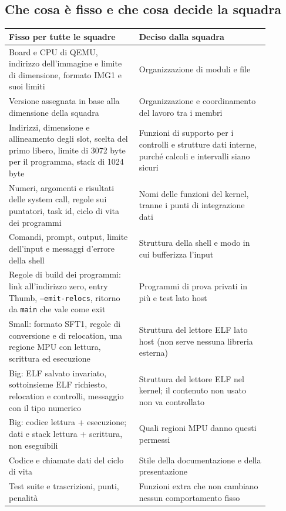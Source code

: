 \subsection{Che cosa è fisso e che cosa decide la squadra}

\begin{center}
\small
\begin{tabular}{|p{0.44\linewidth}|p{0.44\linewidth}|}
\hline
\raggedright Fisso per tutte le squadre & \raggedright Deciso dalla squadra \tabularnewline
\hline\hline
\raggedright Board e CPU di QEMU, indirizzo dell'immagine e limite di dimensione, formato IMG1 e suoi limiti & \raggedright Organizzazione di moduli e file \tabularnewline
\hline
\raggedright Versione assegnata in base alla dimensione della squadra & \raggedright Organizzazione e coordinamento del lavoro tra i membri \tabularnewline
\hline
\raggedright Indirizzi, dimensione e allineamento degli slot, scelta del primo libero, limite di 3072 byte per il programma, stack di 1024 byte & \raggedright Funzioni di supporto per i controlli e strutture dati interne, purché calcoli e intervalli siano sicuri \tabularnewline
\hline
\raggedright Numeri, argomenti e risultati delle system call, regole sui puntatori, task id, ciclo di vita dei programmi & \raggedright Nomi delle funzioni del kernel, tranne i punti di integrazione dati \tabularnewline
\hline
\raggedright Comandi, prompt, output, limite dell'input e messaggi d'errore della shell & \raggedright Struttura della shell e modo in cui bufferizza l'input \tabularnewline
\hline
\raggedright Regole di build dei programmi: link all'indirizzo zero, entry Thumb, \texttt{--emit-relocs}, ritorno da \texttt{main} che vale come exit & \raggedright Programmi di prova privati in più e test lato host \tabularnewline
\hline
\raggedright Small: formato SFT1, regole di conversione e di relocation, una regione MPU con lettura, scrittura ed esecuzione & \raggedright Struttura del lettore ELF lato host (non serve nessuna libreria esterna) \tabularnewline
\hline
\raggedright Big: ELF salvato invariato, sottoinsieme ELF richiesto, relocation e controlli, messaggio con il tipo numerico & \raggedright Struttura del lettore ELF nel kernel; il contenuto non usato non va controllato \tabularnewline
\hline
\raggedright Big: codice lettura + esecuzione; dati e stack lettura + scrittura, non eseguibili & \raggedright Quali regioni MPU danno questi permessi \tabularnewline
\hline
\raggedright Codice e chiamate dati del ciclo di vita & \raggedright Stile della documentazione e della presentazione \tabularnewline
\hline
\raggedright Test suite e trascrizioni, punti, penalità & \raggedright Funzioni extra che non cambiano nessun comportamento fisso \tabularnewline
\hline
\end{tabular}
\end{center}

